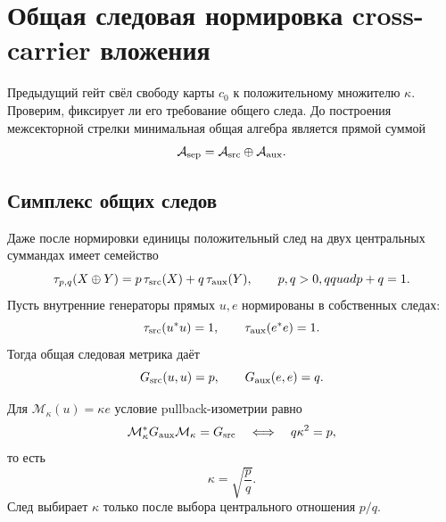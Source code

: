 \chapter{Общая следовая нормировка cross-carrier вложения}
\label{ch:v8-baryon-c0-common-trace-embedding-normalization-gate}

Предыдущий гейт свёл свободу карты $c_0$ к положительному множителю
$\kappa$. Проверим, фиксирует ли его требование общего следа. До построения
межсекторной стрелки минимальная общая алгебра является прямой суммой
\begin{equation}
 \mathcal A_{\rm sep}=\mathcal A_{\rm src}\oplus\mathcal A_{\rm aux}.
 \label{eq:v8-baryon-c0-separated-common-algebra}
\end{equation}

\section{Симплекс общих следов}

Даже после нормировки единицы положительный след на двух центральных
суммандах имеет семейство
\begin{equation}
 \tau_{p,q}(X\oplus Y)
 =p\,\tau_{\rm src}(X)+q\,\tau_{\rm aux}(Y),
 \qquad p,q>0,qquad p+q=1.
 \label{eq:v8-baryon-c0-direct-sum-trace-simplex}
\end{equation}
Пусть внутренние генераторы прямых $u,e$ нормированы в собственных следах:
\begin{equation}
 \tau_{\rm src}(u^*u)=1,
 \qquad
 \tau_{\rm aux}(e^*e)=1.
 \label{eq:v8-baryon-c0-summand-unit-norms}
\end{equation}
Тогда общая следовая метрика даёт
\begin{equation}
 G_{\rm src}(u,u)=p,
 \qquad
 G_{\rm aux}(e,e)=q.
 \label{eq:v8-baryon-c0-weighted-line-metrics}
\end{equation}

Для $\mathcal M_\kappa(u)=\kappa e$ условие pullback-изометрии равно
\begin{equation}
 \mathcal M_\kappa^*G_{\rm aux}\mathcal M_\kappa=G_{\rm src}
 \quad\Longleftrightarrow\quad
 q\kappa^2=p,
 \label{eq:v8-baryon-c0-trace-isometry-equation}
\end{equation}
то есть
\begin{equation}
 \kappa=\sqrt{\frac pq}.
 \label{eq:v8-baryon-c0-trace-weight-selector}
\end{equation}
След выбирает $\kappa$ только после выбора центрального отношения $p/q$.

